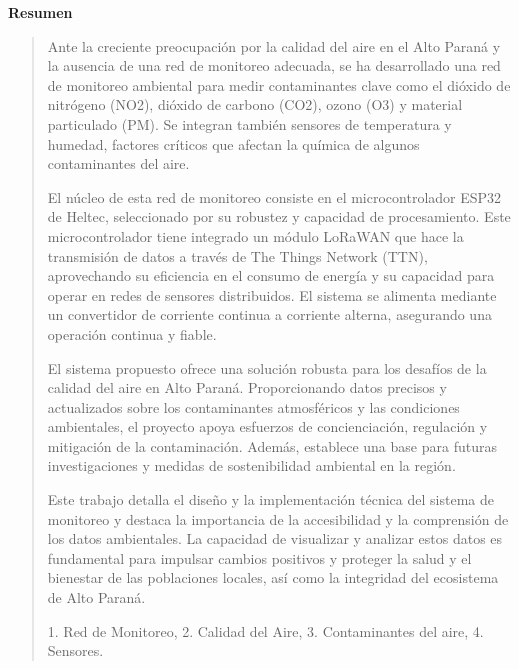 \thispagestyle{empty}
\begin{center}
\begin{LARGE}
\textbf{Resumen}
\end{LARGE}
\end{center}
\begin{quotation}

Ante la creciente preocupación por la calidad del aire en el Alto Paraná y la ausencia de una red de monitoreo adecuada, se ha desarrollado una red de monitoreo ambiental para medir contaminantes clave como el dióxido de nitrógeno (NO2), dióxido de carbono (CO2), ozono (O3) y material particulado (PM). Se integran también sensores de temperatura y humedad, factores críticos que afectan la química de algunos contaminantes del aire.

El núcleo de esta red de monitoreo consiste en el microcontrolador ESP32 de Heltec, seleccionado por su robustez y capacidad de procesamiento. Este microcontrolador tiene integrado un módulo LoRaWAN que hace la transmisión de datos a través de The Things Network (TTN), aprovechando su eficiencia en el consumo de energía y su capacidad para operar en redes de sensores distribuidos. El sistema se alimenta mediante un convertidor de corriente continua a corriente alterna, asegurando una operación continua y fiable.

El sistema propuesto ofrece una solución robusta para los desafíos de la calidad del aire en Alto Paraná. Proporcionando datos precisos y actualizados sobre los contaminantes atmosféricos y las condiciones ambientales, el proyecto apoya esfuerzos de concienciación, regulación y mitigación de la contaminación. Además, establece una base para futuras investigaciones y medidas de sostenibilidad ambiental en la región.

Este trabajo detalla el diseño y la implementación técnica del sistema de monitoreo y destaca la importancia de la accesibilidad y la comprensión de los datos ambientales. La capacidad de visualizar y analizar estos datos es fundamental para impulsar cambios positivos y proteger la salud y el bienestar de las poblaciones locales, así como la integridad del ecosistema de Alto Paraná.

\vspace*{0.5cm}

 1. Red de Monitoreo, 2. Calidad del Aire, 
3. Contaminantes del aire, 4. Sensores.

\end{quotation}
